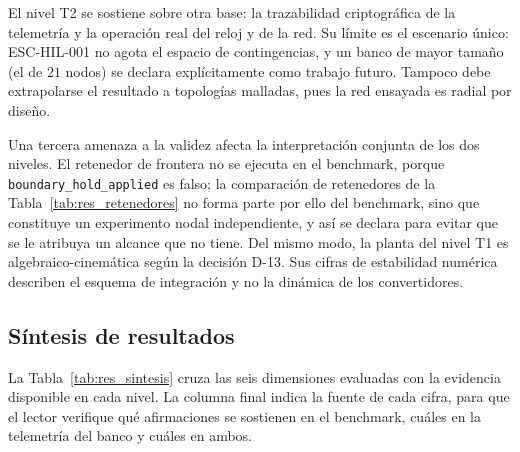 El nivel T2 se sostiene sobre otra base: la trazabilidad criptográfica de la telemetría y la operación real del reloj y de la red. Su límite es el escenario único: ESC-HIL-001 no agota el espacio de contingencias, y un banco de mayor tamaño (el de $21$ nodos) se declara explícitamente como trabajo futuro. Tampoco debe extrapolarse el resultado a topologías malladas, pues la red ensayada es radial por diseño.

Una tercera amenaza a la validez afecta la interpretación conjunta de los dos niveles. El retenedor de frontera no se ejecuta en el benchmark, porque \texttt{boundary\_hold\_applied} es falso; la comparación de retenedores de la Tabla~\ref{tab:res_retenedores} no forma parte por ello del benchmark, sino que constituye un experimento nodal independiente, y así se declara para evitar que se le atribuya un alcance que no tiene. Del mismo modo, la planta del nivel T1 es algebraico-cinemática según la decisión D-13. Sus cifras de estabilidad numérica describen el esquema de integración y no la dinámica de los convertidores.

\subsection{Síntesis de resultados}

La Tabla~\ref{tab:res_sintesis} cruza las seis dimensiones evaluadas con la evidencia disponible en cada nivel. La columna final indica la fuente de cada cifra, para que el lector verifique qué afirmaciones se sostienen en el benchmark, cuáles en la telemetría del banco y cuáles en ambos.

